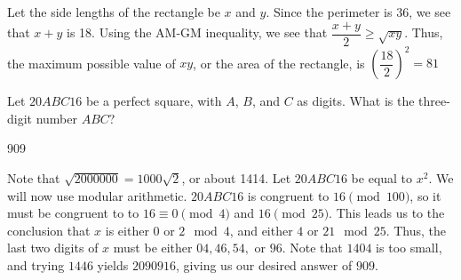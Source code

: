 \documentclass[11pt]{article}
\begin{document}
\begin{solution}
Let the side lengths of the rectangle be $x$ and $y$. Since the perimeter is 36, we see that $x+y$ is 18. Using the AM-GM inequality, we see that $\dfrac{x+y}{2} \geq \sqrt{xy}$. Thus, the maximum possible value of $xy$, or the area of the rectangle, is $\left(\dfrac{18}{2}\right)^2=\boxed{81}$ 
\end{solution}

\begin{problem}
Let $20ABC16$ be a perfect square, with $A$, $B$, and $C$ as digits. What is the three-digit number $ABC$?
\end{problem}

\begin{answer}
909
\end{answer}

\begin{solution}    
Note that $\sqrt{2000000} = 1000\sqrt{2}$, or about 1414. Let $20ABC16$ be equal to $x^2$. We will now use modular arithmetic. $20ABC16$ is congruent to $16 \pmod 100$, so it must be congruent to to $16 \equiv 0 \pmod 4$ and $16 \pmod 25$. This leads us to the conclusion that $x$ is either $0$  or $2 \mod 4$, and either $4$ or $21 \mod 25$. Thus, the last two digits of $x$ must be either $04, 46, 54,$ or $96$. Note that $1404$ is too small, and trying $1446$ yields $2090916$, giving us our desired answer of $\boxed{909}$.
\end{solution}
\end{document}
